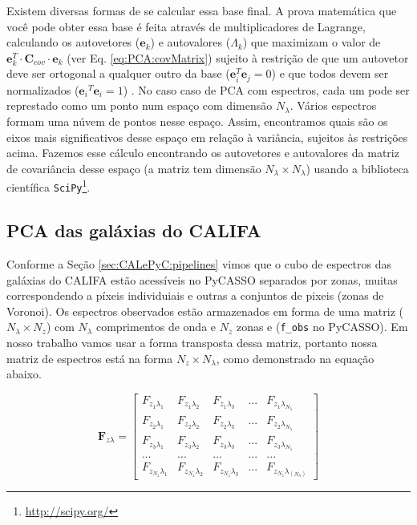 Existem diversas formas de se calcular essa base final. A prova matemática que você pode obter essa base é feita através
de multiplicadores de Lagrange, calculando os autovetores ($\mathbf{e}{}_k$) e autovalores ($\Lambda_k$) que maximizam o
valor de $\mathbf{e}{}_k^T \cdot \mathbf{C}{}_{cov} \cdot \mathbf{e}{}_k$ (ver Eq. \ref{eq:PCA:covMatrix}) sujeito à
restrição de que um autovetor deve ser ortogonal a qualquer outro da base ($\mathbf{e}{}_i^T \mathbf{e}{}_j = 0$) e que
todos devem ser normalizados ($\mathbf{e}{}_i{}^T \mathbf{e}{}_i = 1$) \citep[][p. 5-6]{JolliffePCA1986}. No caso caso
de PCA com espectros, cada um pode ser represtado como um ponto num espaço com dimensão $N_\lambda$. Vários espectros
formam uma núvem de pontos nesse espaço. Assim, encontramos quais são os eixos mais significativos desse espaço em
relação à variância, sujeitos às restrições acima. Fazemos esse cálculo encontrando os autovetores e autovalores da
matriz de covariância desse espaço (a matriz tem dimensão $N_\lambda \times N_\lambda$) usando a biblioteca científica
\texttt{SciPy}\footnote{\url{http://scipy.org/}}.

\subsection{PCA das galáxias do CALIFA}

Conforme a Seção \ref{sec:CALePyC:pipelines} vimos que o cubo de espectros das galáxias do CALIFA estão acessíveis no
PyCASSO separados por zonas, muitas correspondendo a píxeis individuiais e outras a conjuntos de pixeis (zonas de
Voronoi). Os espectros observados estão armazenados em forma de uma matriz ($N_\lambda \times N_z$) com $N_\lambda$
comprimentos de onda e $N_z$ zonas e (\texttt{f\_obs} no PyCASSO). Em nosso trabalho vamos usar a forma transposta dessa
matriz, portanto nossa matriz de espectros está na forma $N_z \times N_\lambda$, como demonstrado na equação abaixo.

\begin{equation}
    \label{eq:PCA:fluxMatrix}
    \textbf{F}{}_{z \lambda} = \left[
    \begin{array}{ccccc}
        F_{z_1 \lambda_1} & F_{z_1 \lambda_2} & F_{z_1 \lambda_3} & ... & F_{z_1 \lambda_{N_\lambda}} \\
        F_{z_2 \lambda_1} & F_{z_2 \lambda_2} & F_{z_2 \lambda_3} & ... & F_{z_2 \lambda_{N_\lambda}} \\
        F_{z_3 \lambda_1} & F_{z_3 \lambda_2} & F_{z_3 \lambda_3} & ... & F_{z_3 \lambda_{N_\lambda}} \\
        ...               & ...               & ...               & ... & ...               \\
        F_{z_{N_z} \lambda_1} & F_{z_{N_z} \lambda_2} & F_{z_{N_z} \lambda_3} & ... & F_{z_{N_z}
        \lambda_{(N_\lambda)}}
    \end{array} 
    \right]
\end{equation}

